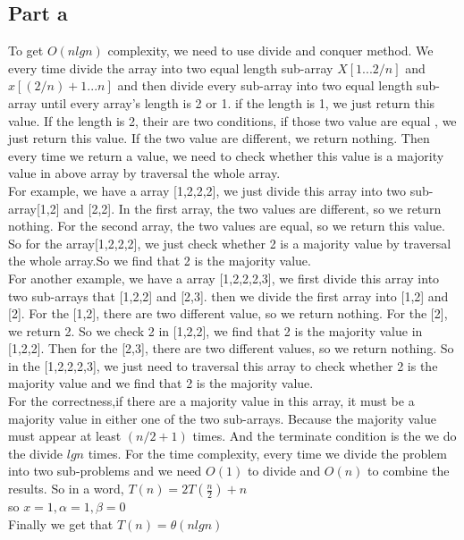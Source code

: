 \documentclass[paper=a4, fontsize=11pt]{scrartcl} %
\numberwithin{equation}{section} %
\numberwithin{figure}{section} %
\numberwithin{table}{section} %
\begin{document}
\subsection{Part a}
To get $O(nlgn)$ complexity, we need to use divide and conquer method.
We every time divide the array into two equal length sub-array $X[1...2/n]$ and $x[{(2/n)}+1...n]$ and then divide every sub-array into two equal length sub-array until every array's length is 2 or 1. if the length is 1, we just return this value. If the length is 2, their are two conditions, if those two value are equal , we just return this value. If the two value are different, we return nothing. Then every time we return a value, we need to check whether this value is a majority value in above array by traversal the whole array.\\
For example, we have a array [1,2,2,2], we just divide this array into two sub-array[1,2] and [2,2]. In the first array, the two values are different, so we return nothing. For the second array, the two values are equal, so we return this value. So for the array[1,2,2,2], we just check whether 2 is a majority value by traversal the whole array.So we find that 2 is the majority value.\\
For another example, we have a array [1,2,2,2,3], we first divide this array into two sub-arrays that [1,2,2] and [2,3]. then we divide the first array into [1,2] and [2]. For the [1,2], there are two different value, so we return nothing. For the [2], we return 2. So we check 2 in [1,2,2], we find that 2 is the majority value in [1,2,2]. Then for the [2,3], there are two different values, so we return nothing. So in the [1,2,2,2,3], we just need to traversal this array to check whether 2 is the majority value and we find that 2 is the majority value.\\
For the correctness,if there are a majority value in this array, it must be a majority value in either one of the two sub-arrays. Because the majority value must appear at least $ (n/2 +1)$ times. And the terminate condition is the we do the divide $lgn$ times.
For the time complexity, every time we divide the problem into two sub-problems and we need $O(1)$ to divide and $O(n)$ to combine the results. So in a word, $T(n)=2T(\frac{n}{2})+n$\\
so $x=1,\alpha=1 , \beta=0$\\
Finally we get that $T(n)=\theta(nlgn)$
\end{document}
